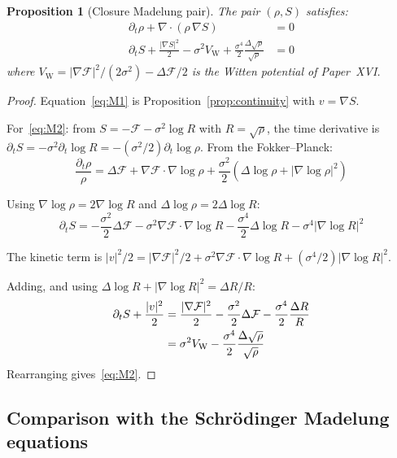 \documentclass[12pt]{article}
\newtheorem{proposition}[theorem]{Proposition}
\newcommand{\Fcal}{\mathcal{F}}
\newcommand{\VW}{V_{\mathrm{W}}}
\begin{document}
\begin{proposition}[Closure Madelung pair]\label{prop:madelung}
The pair $(\rho, S)$ satisfies:
\begin{align}
    \partial_t\rho + \nabla\cdot(\rho\,\nabla S) &= 0 \label{eq:M1} \\[4pt]
    \partial_t S + \frac{|\nabla S|^2}{2} - \sigma^2 \VW + \frac{\sigma^4}{2}\frac{\Delta\sqrt{\rho}}{\sqrt{\rho}} &= 0 \label{eq:M2}
\end{align}
where $\VW = |\nabla\Fcal|^2/(2\sigma^2) - \Delta\Fcal/2$ is the Witten potential of Paper~XVI.
\end{proposition}

\begin{proof}
Equation~\eqref{eq:M1} is Proposition~\ref{prop:continuity} with $v = \nabla S$.

For~\eqref{eq:M2}: from $S = -\Fcal - \sigma^2\log R$ with $R = \sqrt{\rho}$, the time derivative is $\partial_t S = -\sigma^2\partial_t\log R = -(\sigma^2/2)\partial_t\log\rho$. From the Fokker--Planck:
\begin{equation}
    \frac{\partial_t\rho}{\rho} = \Delta\Fcal + \nabla\Fcal\cdot\nabla\log\rho + \frac{\sigma^2}{2}(\Delta\log\rho + |\nabla\log\rho|^2)
\end{equation}

Using $\nabla\log\rho = 2\nabla\log R$ and $\Delta\log\rho = 2\Delta\log R$:
\begin{equation}
    \partial_t S = -\frac{\sigma^2}{2}\Delta\Fcal - \sigma^2\nabla\Fcal\cdot\nabla\log R - \frac{\sigma^4}{2}\Delta\log R - \sigma^4|\nabla\log R|^2
\end{equation}

The kinetic term is $|v|^2/2 = |\nabla\Fcal|^2/2 + \sigma^2\nabla\Fcal\cdot\nabla\log R + (\sigma^4/2)|\nabla\log R|^2$.

Adding, and using $\Delta\log R + |\nabla\log R|^2 = \Delta R/R$:
\begin{align}
    \partial_t S + \frac{|v|^2}{2} &= \frac{|\nabla\Fcal|^2}{2} - \frac{\sigma^2}{2}\Delta\Fcal - \frac{\sigma^4}{2}\frac{\Delta R}{R} \notag \\
    &= \sigma^2 \VW - \frac{\sigma^4}{2}\frac{\Delta\sqrt{\rho}}{\sqrt{\rho}}
\end{align}
Rearranging gives~\eqref{eq:M2}.
\end{proof}

\subsection{Comparison with the Schr\"odinger Madelung equations}
\end{document}
